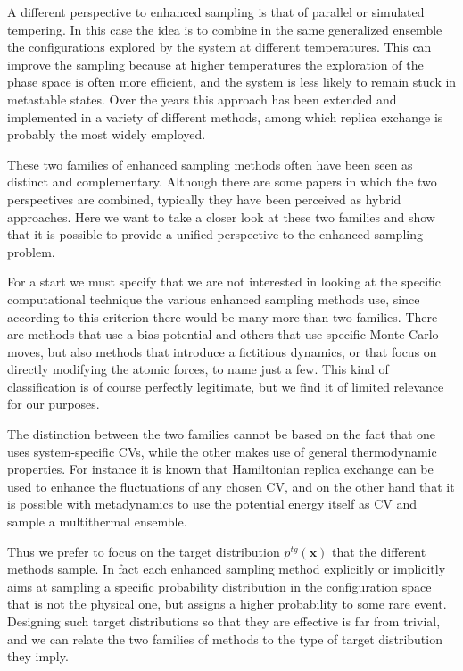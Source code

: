 \documentclass[aps,prx,reprint,superscriptaddress]{revtex4-1} %
\begin{document}
A different perspective to enhanced sampling is that of parallel or simulated tempering\cite{Swendsen1986,Marinari1992}.
In this case the idea is to combine in the same generalized ensemble the configurations explored by the system at different temperatures.
This can improve the sampling because at higher temperatures the exploration of the phase space is often more efficient, and the system is less likely to remain stuck in metastable states.
Over the years this approach has been extended and implemented in a variety of different methods, among which replica exchange\cite{Sugita1999} is probably the most widely employed.

These two families of enhanced sampling methods often have been seen as distinct and complementary.
Although there are some papers in which the two perspectives are combined\cite{Bussi2006,Piana2007,Bonomi2010,Nava2015}, typically they have been perceived as hybrid approaches\cite{Abrams2014,Yang2019}.
Here we want to take a closer look at these two families and show that it is possible to provide a unified perspective to the enhanced sampling problem.

For a start we must specify that we are not interested in looking at the specific computational technique the various enhanced sampling methods use, since according to this criterion there would be many more than two families.
There are methods that use a bias potential and others that use specific Monte Carlo moves\cite{Sugita1999}, but also methods that introduce a fictitious dynamics\cite{Rosso2002}, or that focus on directly modifying the atomic forces\cite{Darve2001}, to name just a few.
This kind of classification is of course perfectly legitimate, but we find it of limited relevance for our purposes.

The distinction between the two families cannot be based on the fact that one uses system-specific CVs, while the other makes use of general thermodynamic properties.
For instance it is known that Hamiltonian replica exchange can be used to enhance the fluctuations of any chosen CV\cite{Sugita2000}, and on the other hand that it is possible with metadynamics to use the potential energy itself as CV and sample a multithermal ensemble\cite{Micheletti2004}.

Thus we prefer to focus on the target distribution $p^{tg}(\mathbf{x})$ that the different methods sample.
In fact each enhanced sampling method explicitly or implicitly aims at sampling a specific probability distribution in the configuration space that is not the physical one, but assigns a higher probability to some rare event.
Designing such target distributions so that they are effective is far from trivial, and we can relate the two families of methods to the type of target distribution they imply.
\end{document}
